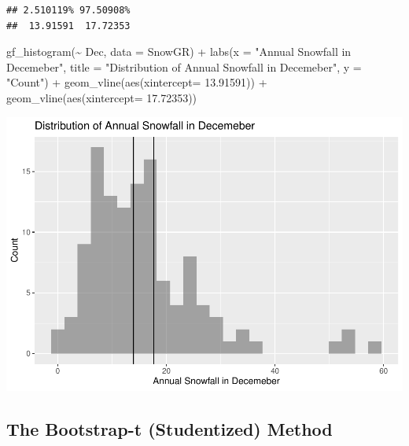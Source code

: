 \documentclass[12pt]{article}
\newenvironment{Shaded}{\begin{snugshade}}{\end{snugshade}}
\newcommand{\AttributeTok}[1]{\textcolor[rgb]{0.77,0.63,0.00}{#1}}
\newcommand{\FloatTok}[1]{\textcolor[rgb]{0.00,0.00,0.81}{#1}}
\newcommand{\FunctionTok}[1]{\textcolor[rgb]{0.00,0.00,0.00}{#1}}
\newcommand{\NormalTok}[1]{#1}
\newcommand{\SpecialCharTok}[1]{\textcolor[rgb]{0.00,0.00,0.00}{#1}}
\newcommand{\StringTok}[1]{\textcolor[rgb]{0.31,0.60,0.02}{#1}}
\begin{document}
\begin{verbatim}
## 2.510119% 97.50908% 
##  13.91591  17.72353
\end{verbatim}

\begin{Shaded}
\begin{Highlighting}[]
\FunctionTok{gf\_histogram}\NormalTok{(}\SpecialCharTok{\textasciitilde{}}\NormalTok{ Dec, }\AttributeTok{data =}\NormalTok{ SnowGR) }\SpecialCharTok{+}
  \FunctionTok{labs}\NormalTok{(}\AttributeTok{x =} \StringTok{"Annual Snowfall in Decemeber"}\NormalTok{, }
       \AttributeTok{title =} \StringTok{"Distribution of Annual Snowfall in Decemeber"}\NormalTok{, }\AttributeTok{y =} \StringTok{"Count"}\NormalTok{) }\SpecialCharTok{+}
  \FunctionTok{geom\_vline}\NormalTok{(}\FunctionTok{aes}\NormalTok{(}\AttributeTok{xintercept=} \FloatTok{13.91591}\NormalTok{)) }\SpecialCharTok{+}
  \FunctionTok{geom\_vline}\NormalTok{(}\FunctionTok{aes}\NormalTok{(}\AttributeTok{xintercept=} \FloatTok{17.72353}\NormalTok{))}
\end{Highlighting}
\end{Shaded}

\includegraphics{paper_files/figure-latex/unnamed-chunk-17-1.pdf}

\hypertarget{the-bootstrap-t-studentized-method}{%
\subsection{The Bootstrap-t (Studentized)
Method}\label{the-bootstrap-t-studentized-method}}
\end{document}
